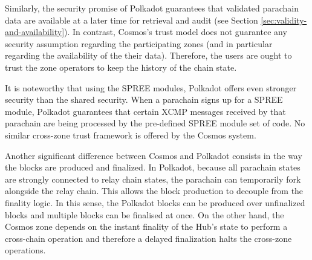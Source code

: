 Similarly, the security promise of Polkadot guarantees that validated parachain data are available at a later time for retrieval and audit (see Section \ref{sec:validity-and-availability}). In contrast,  Cosmos's trust model does not guarantee any security assumption regarding the participating zones (and in particular regarding the availability of the their data). Therefore, the users are ought to trust the zone operators to keep the history of the chain state.

It is noteworthy that using the SPREE modules, Polkadot offers even stronger security than the shared security.
When a parachain signs up for a SPREE module, Polkadot guarantees that certain XCMP messages received by that parachain are being processed by the pre-defined SPREE module set of code. No similar cross-zone trust framework is offered by the Cosmos system.

Another significant difference between Cosmos and Polkadot consists in the way the blocks are produced and finalized. In Polkadot, because all parachain states are strongly connected to relay chain states, the parachain can temporarily fork alongside the relay chain. This allows the block production to decouple from the finality logic. In this sense, the Polkadot blocks can be produced over unfinalized blocks and multiple blocks can be finalised at once. On the other hand, the Cosmos zone depends on the instant finality of the Hub's state to perform a cross-chain operation and therefore a delayed finalization halts the cross-zone operations.


